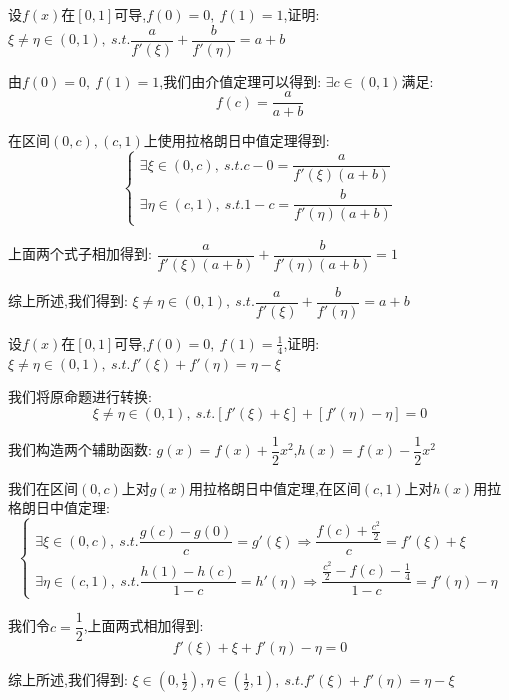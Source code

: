 \begin{proposition}
	设$f(x)$在$[0,1]$可导,$f(0)=0,\ f(1)=1$,证明: $\xi\neq \eta\in(0,1),\ s.t. \dfrac{a}{f'(\xi)}+\dfrac{b}{f'(\eta)}=a+b$
\end{proposition}
\begin{solution}

	由$f(0)=0,\ f(1)=1$,我们由介值定理可以得到: $\exists c\in(0,1)$满足:
	$$f(c)=\dfrac{a}{a+b}$$

	在区间$(0,c),(c,1)$上使用拉格朗日中值定理得到:
	$$\left\lbrace
		\begin{array}{l}
			\exists\xi\in(0,c),\ s.t. c-0=\dfrac{a}{f'(\xi)(a+b)} \\
			\exists\eta\in(c,1),\ s.t. 1-c=\dfrac{b}{f'(\eta)(a+b)}
		\end{array}
		\right. $$

	上面两个式子相加得到: $\dfrac{a}{f'(\xi)(a+b)}+\dfrac{b}{f'(\eta)(a+b)}=1$

	综上所述,我们得到: $\xi\neq \eta\in(0,1),\ s.t. \dfrac{a}{f'(\xi)}+\dfrac{b}{f'(\eta)}=a+b$
\end{solution}


\begin{proposition}
	设$f(x)$在$[0,1]$可导,$f(0)=0,\ f(1)=\frac{1}{4}$,证明: $\xi\neq \eta\in(0,1),\ s.t. f'(\xi)+f'(\eta)=\eta-\xi$
\end{proposition}
\begin{solution}

	我们将原命题进行转换:
	$$\xi\neq \eta\in(0,1),\ s.t. [f'(\xi)+\xi]+[f'(\eta)-\eta]=0$$

	我们构造两个辅助函数: $g(x)=f(x)+\dfrac{1}{2}x^2$,$h(x)=f(x)-\dfrac{1}{2}x^2$

	我们在区间$(0,c)$上对$g(x)$用拉格朗日中值定理,在区间$(c,1)$上对$h(x)$用拉格朗日中值定理:
	$$\left\lbrace
		\begin{array}{l}
			\exists\xi\in(0,c),\ s.t. \dfrac{g(c)-g(0)}{c}=g'(\xi)\Rightarrow \dfrac{f(c)+\frac{c^2}{2}}{c}=f'(\xi)+\xi \\
			\exists\eta\in(c,1),\ s.t. \dfrac{h(1)-h(c)}{1-c}=h'(\eta)\Rightarrow \dfrac{\frac{c^2}{2}-f(c)-\frac{1}{4}}{1-c}=f'(\eta)-\eta
		\end{array}
		\right. $$

	我们令$c=\dfrac{1}{2}$,上面两式相加得到:
	$$f'(\xi)+\xi+f'(\eta)-\eta=0$$

	综上所述,我们得到: $\xi\in(0,\frac{1}{2}),\eta\in(\frac{1}{2},1),\ s.t. f'(\xi)+f'(\eta)=\eta-\xi$

\end{solution}

